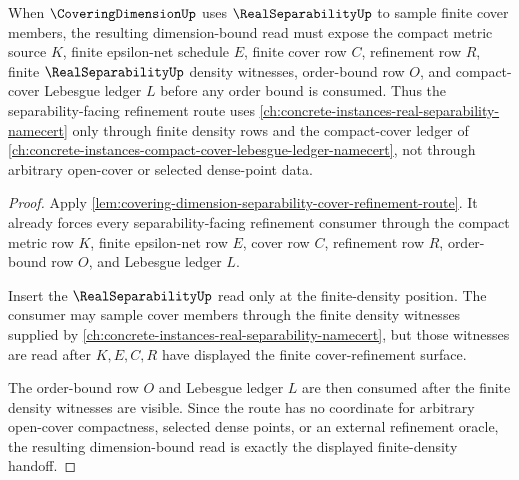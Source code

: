 \begin{theorem}
\label{thm:coveringdimension-real-separability-refinement-bound}
When $\CoveringDimensionUp$ uses $\RealSeparabilityUp$ to sample finite cover members, the resulting dimension-bound read must expose the compact metric source $K$, finite epsilon-net schedule $E$, finite cover row $C$, refinement row $R$, finite $\RealSeparabilityUp$ density witnesses, order-bound row $O$, and compact-cover Lebesgue ledger $L$ before any order bound is consumed. Thus the separability-facing refinement route uses \autoref{ch:concrete-instances-real-separability-namecert} only through finite density rows and the compact-cover ledger of \autoref{ch:concrete-instances-compact-cover-lebesgue-ledger-namecert}, not through arbitrary open-cover or selected dense-point data.
\end{theorem}
\begin{proof}
Apply \autoref{lem:covering-dimension-separability-cover-refinement-route}. It already forces every separability-facing refinement consumer through the compact metric row $K$, finite epsilon-net row $E$, cover row $C$, refinement row $R$, order-bound row $O$, and Lebesgue ledger $L$.

Insert the $\RealSeparabilityUp$ read only at the finite-density position. The consumer may sample cover members through the finite density witnesses supplied by \autoref{ch:concrete-instances-real-separability-namecert}, but those witnesses are read after $K,E,C,R$ have displayed the finite cover-refinement surface.

The order-bound row $O$ and Lebesgue ledger $L$ are then consumed after the finite density witnesses are visible. Since the route has no coordinate for arbitrary open-cover compactness, selected dense points, or an external refinement oracle, the resulting dimension-bound read is exactly the displayed finite-density handoff.
\end{proof}
